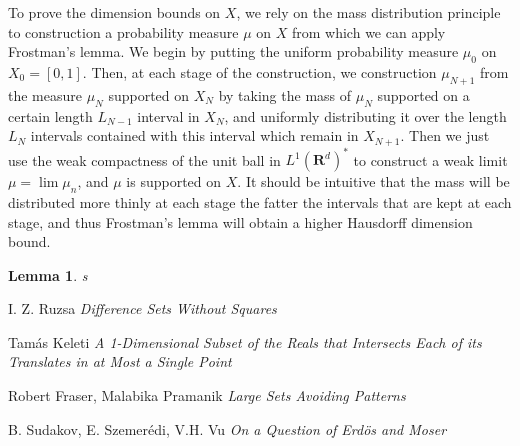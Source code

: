 \documentclass{article}
\theoremstyle{plain}
\newtheorem{lemma}{Lemma}
\theoremstyle{plain}
\begin{document}
\begin{multicols}{2}
To prove the dimension bounds on $X$, we rely on the mass distribution principle to construction a probability measure $\mu$ on $X$ from which we can apply Frostman's lemma. We begin by putting the uniform probability measure $\mu_0$ on $X_0 = [0,1]$. Then, at each stage of the construction, we construction $\mu_{N+1}$ from the measure $\mu_N$ supported on $X_N$ by taking the mass of $\mu_N$ supported on a certain length $L_{N-1}$ interval in $X_N$, and uniformly distributing it over the length $L_N$ intervals contained with this interval which remain in $X_{N+1}$. Then we just use the weak compactness of the unit ball in $L^1(\mathbf{R}^d)^*$ to construct a weak limit $\mu = \lim \mu_n$, and $\mu$ is supported on $X$. It should be intuitive that the mass will be distributed more thinly at each stage the fatter the intervals that are kept at each stage, and thus Frostman's lemma will obtain a higher Hausdorff dimension bound.

\begin{lemma}
	s
\end{lemma}

\end{multicols}

\begin{thebibliography}{9}

I. Z. Ruzsa
\textit{Difference Sets Without Squares}

Tam\'{a}s Keleti
\textit{A 1-Dimensional Subset of the Reals that Intersects Each of its Translates in at Most a Single Point}

Robert Fraser, Malabika Pramanik
\textit{Large Sets Avoiding Patterns}

B. Sudakov, E. Szemer\'{e}di, V.H. Vu
\textit{On a Question of Erd\"{o}s and Moser}

\end{thebibliography}


\end{document}
